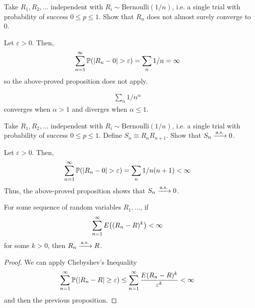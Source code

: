 \begin{example}
    Take $R_1, R_2, \ldots$ independent with $R_i \sim \text{Bernoulli}(1/n)$, i.e. a single trial with probability of success $0 \le p \le 1$. Show that $R_n$ does not almost surely converge to $0$.
\end{example}
\begin{solution}
    Let $\varepsilon > 0$. Then,
    \begin{align}
        \sum_{n=1}^\infty \mathbb{P}\qty(\abs{R_n - 0} > \varepsilon) = \sum_n 1/n = \infty
    \end{align}
    so the above-proved proposition does not apply.
\end{solution}

\begin{aside}
    \begin{align}
        \sum_n 1/n^\alpha
    \end{align}
    converges when $\alpha > 1$ and diverges when $\alpha \le 1$.
\end{aside}

\begin{example}
    Take $R_1, R_2, \ldots$ independent with $R_i \sim \text{Bernoulli}(1/n)$, i.e. a single trial with probability of success $0 \le p \le 1$. Define $S_n \equiv R_n R_{n+1}$. Show that $S_n \ce{->[\text{a.s.}]} 0$.
\end{example}
\begin{solution}
    Let $\varepsilon > 0$. Then,
    \begin{align}
        \sum_{n=1}^\infty \mathbb{P}\qty(\abs{R_n - 0} > \varepsilon) = \sum_n 1/n(n+1) < \infty
    \end{align}
    Thus, the above-proved proposition shows that $S_n \ce{->[\text{a.s.}]} 0$.
\end{solution}

\begin{proposition}
    For some sequence of random variables $R_1, \ldots$, if
    \begin{align}
        \sum_{n=1}^\infty E\qty((R_n - R)^k) < \infty
    \end{align}
    for some $k > 0$, then $R_n \ce{->[\text{a.s.}]} R$.
\end{proposition}
\begin{proof}
    We can apply Chebyshev's Inequality
    \begin{align}
        \sum_{n=1}^\infty \mathbb{P}(\abs{R_n - R} \ge \varepsilon) \le \sum_{n=1}^\infty \frac{E(R_n - R)^k}{\varepsilon^k} < \infty
    \end{align}
    and then the previous proposition.
\end{proof}


